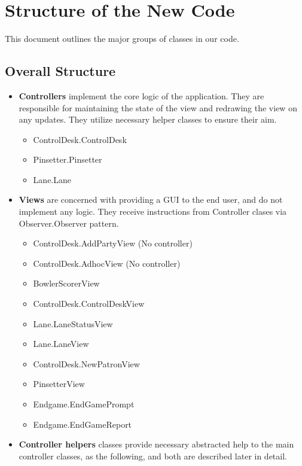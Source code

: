\section{Structure of the New Code}

This document outlines the major groups of classes in our code.

\subsection{Overall Structure}

\begin{itemize}
    \item \textbf{Controllers} implement the core logic of the application. They are responsible for maintaining the state of the view and redrawing the view on any updates. They utilize necessary helper classes to ensure their aim.
          \begin{itemize}
              \item ControlDesk.ControlDesk
              \item Pinsetter.Pinsetter
              \item Lane.Lane
          \end{itemize}
    \item \textbf{Views} are concerned with providing a GUI to the end user, and do not implement any logic. They receive instructions from Controller clases via Observer.Observer pattern.
          \begin{itemize}
              \item ControlDesk.AddPartyView (No controller)
              \item ControlDesk.AdhocView (No controller)
              \item BowlerScorerView
              \item ControlDesk.ControlDeskView
              \item Lane.LaneStatusView
              \item Lane.LaneView
              \item ControlDesk.NewPatronView
              \item PinsetterView
              \item Endgame.EndGamePrompt
              \item Endgame.EndGameReport
          \end{itemize}
    \item \textbf{Controller helpers} classes provide necessary abstracted help to the main controller classes, as the following, and both are described later in detail.

\end{itemize}
